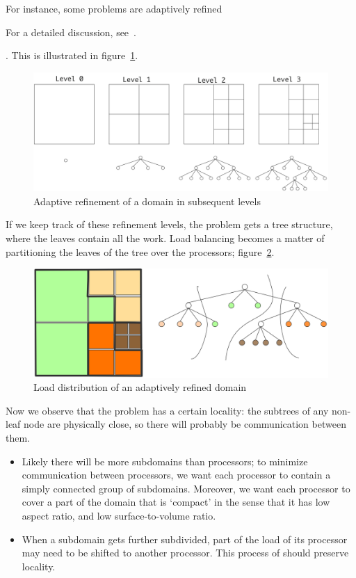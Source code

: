 For instance, some problems are adaptively
refined
\begin{footnoteenv}
  {For a detailed
    discussion, see~\cite{Campbell:octree}.}
\end{footnoteenv}
. This is illustrated in
figure~\ref{fig:octree1}.
\begin{figure}[ht]
  \includegraphics[scale=.14]{graphics/my_octree1}
  \caption{Adaptive refinement of a domain in subsequent levels}
  \label{fig:octree1}
\end{figure}
If we keep track of these refinement levels, the problem gets a tree
structure, where the leaves contain all the work.
Load balancing becomes a matter of partitioning the leaves of the
tree over the processors; figure~\ref{fig:octree2}.
\begin{figure}[ht]
  \includegraphics[scale=.18]{graphics/my_octree2}
  \caption{Load distribution of an adaptively refined domain}
  \label{fig:octree2}
\end{figure}
Now we observe that the problem has a certain locality: the subtrees
of any non-leaf node are physically close, so there will probably be
communication between them. 
\begin{itemize}
\item Likely there will be more subdomains than processors; to
  minimize communication between processors, we want each processor to
  contain a simply connected group of subdomains. Moreover, we want
  each processor to cover a part of the domain that is `compact' in
  the sense that it has low aspect ratio, and low surface-to-volume
  ratio.
\item When a subdomain gets further subdivided, part of the load of
  its processor may need to be shifted to another processor. This
  process of  should preserve
  locality.
\end{itemize}

